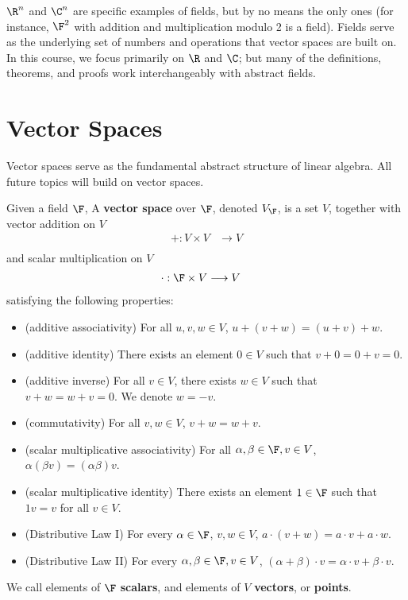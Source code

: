 \documentclass[math0540-lecture-notes.tex]{subfiles}
\begin{document}
$\R^{n}$ and $\C^{n}$ are specific examples of fields, but by no means the only ones (for instance,
$\F^{2}$ with addition and multiplication modulo 2 is a field). Fields serve as the underlying set
of numbers and operations that vector spaces are built on. In this course, we focus primarily on
$\R$ and $\C$; but many of the definitions, theorems, and proofs work interchangeably with abstract
fields.



\section{Vector Spaces}
Vector spaces serve as the fundamental abstract structure of linear algebra. All future topics will
build on vector spaces.
\begin{definition}{}
  Given a field $\F$, A \textbf{vector space} over $\F$, denoted $V_\F$, is a set $V$, together with
  vector addition on $V$ \begin{align*}
    +: V\times V &\longrightarrow V\\
  \end{align*} and scalar multiplication on $V$ \begin{align*}
    \cdot : \F\times V &\longrightarrow V
  \end{align*} satisfying the following properties:
  \begin{itemize}
    \item (additive associativity) For all $u,v,w\in V$, $u+(v+w)=(u+v)+w$.
    \item (additive identity) There exists an element $0\in V$ such that $v+0=0+v=0$.
    \item (additive inverse) For all $v\in V$, there exists $w\in V$ such that $v+w=w+v=0$. We
      denote $w=-v$.
    \item (commutativity) For all $v,w\in V$, $v+w=w+v$.
    \item (scalar multiplicative associativity) For all $ \alpha,\beta\in \F, v\in V$,
      $\alpha(\beta v)=(\alpha\beta)v$.
    \item (scalar multiplicative identity) There exists an element $1\in \F$ such that $1v=v$ for
      all  $v\in V$.
    \item (Distributive Law I) For every $ \alpha\in \F$, $v,w\in V$, $a\cdot (v+w)=a\cdot v+a\cdot
      w$.
    \item (Distributive Law II) For every $\alpha,\beta\in \F, v\in V$, $(\alpha+\beta)\cdot
      v=\alpha\cdot v+\beta\cdot v$.
  \end{itemize}
  We call elements of $\F$ \textbf{scalars}, and elements of $V$ \textbf{vectors}, or
  \textbf{points}.
\end{definition}
\end{document}
